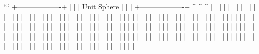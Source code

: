 ```
          +-------------------+
          |                   |
          |    Unit Sphere     |
          |                   |
          +-------------------+
               ^       ^       ^
               |       |       |
               |       |       |
               |       |       |
               |       |       |
               |       |       |
               |       |       |
               |       |       |
               |       |       |
               |       |       |
               |       |       |
               |       |       |
               |       |       |
               |       |       |
               |       |       |
               |       |       |
               |       |       |
               |       |       |
               |       |       |
               |       |       |
               |       |       |
               |       |       |
               |       |       |
               |       |       |
               |       |       |
               |       |       |
               |       |       |
               |       |       |
               |       |       |
               |       |       |
               |       |       |
               |       |       |
               |       |       |
               |       |       |
               |       |       |
               |       |       |
               |       |       |
               |       |       |
               |       |       |
               |       |       |
               |       |       |
               |       |       |
               |       |       |
               |       |       |
               |       |       |
               |       |       |
               |       |       |
               |       |       |
               |       |       |
               |       |       |
               |       |       |
               |       |       |
               |       |       |
               |       |       |
               |       |       |
               |       |       |
               |       |       |
               |       |       |
               |       |       |
               |       |       |
               |       |       |
               |       |       |
               |       |       |
               |       |       |
               |       |       |
               |       |       |
               |       |       |
               |       |       |
               |       |       |
               |       |       |
               |       |       |
               |       |       |
               |       |       |
               |       |       |
